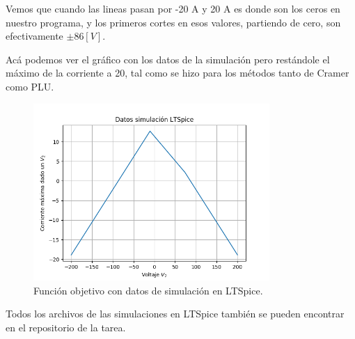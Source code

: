 \documentclass[letter, 11pt]{article}
\begin{document}
Vemos que cuando las lineas pasan por -20 A y 20 A es donde son los ceros en nuestro programa, y los primeros cortes en esos valores, partiendo de cero, son efectivamente $\pm 86[V]$.


Acá podemos ver el gráfico con los datos de la simulación pero restándole el máximo de la corriente a 20, tal como se hizo para los métodos tanto de Cramer como PLU.

\begin{figure}[h]
 \centering
 \includegraphics[width=0.8\textwidth]{./simulacion.png}
 \caption{Función objetivo con datos de simulación en LTSpice.}
\end{figure}

Todos los archivos de las simulaciones en LTSpice también se pueden encontrar en el repositorio de la tarea.
\end{document}
